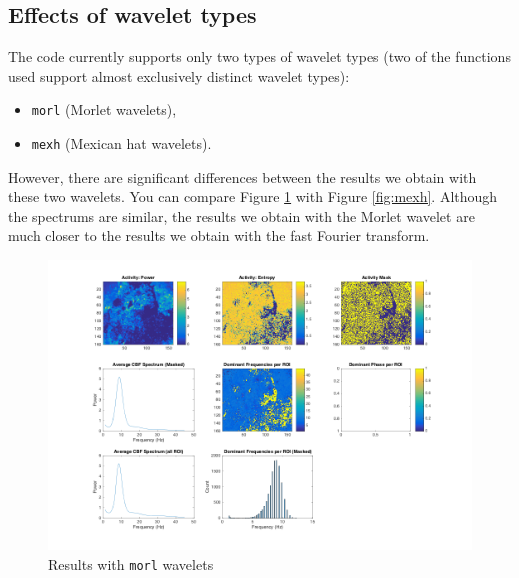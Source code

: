 \documentclass[11pt]{scrartcl}
\begin{document}
\subsection{Effects of wavelet types}
\label{sec:effects-wavel-types}

The code currently supports only two types of wavelet types (two of the functions used support almost
exclusively distinct wavelet types):
\begin{itemize}
\item \texttt{morl} (Morlet wavelets),

\item \texttt{mexh} (Mexican hat wavelets).
\end{itemize}

However, there are significant differences between the results we obtain with these two wavelets. You can
compare Figure \ref{fig:morl} with Figure \ref{fig:mexh}. Although the spectrums are similar, the results we obtain with the Morlet wavelet are much
closer to the results we obtain with the fast Fourier transform.

\begin{figure}[h]
  \centering
  \includegraphics[scale=0.5]{Cylia_beating_movie_mat_Results.png}
  \caption{Results with \texttt{morl} wavelets}
  \label{fig:morl}
\end{figure}
\end{document}
